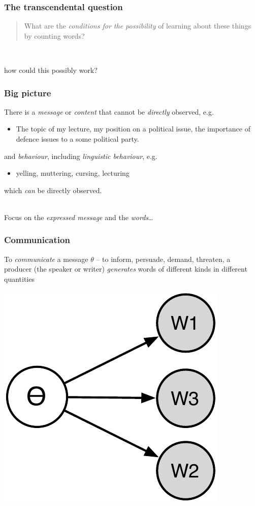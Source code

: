 \documentclass[11pt,compress,professionalfonts]{beamer}
\newcommand{\ita}{\begin{itemize}}
\newcommand{\itm}{\item[]}
\newcommand{\itz}{\end{itemize}}
\begin{document}
\begin{frame}\frametitle{The transcendental question}

\begin{quote}
What are the \textit{conditions for the possibility} of learning about these things by counting words?
\end{quote}

~\\
\centerline{how could this possibly work?}

\end{frame}
\begin{frame}[t]\frametitle{Big picture}

There is a \textsl{message} or \textit{content} that cannot be \textit{directly} observed, e.g.
\ita
\itm The topic of my lecture, my position on a political issue, the importance of defence issues to a some political party.
\itz
and \textit{behaviour}, including \textsl{linguistic behaviour}, e.g.
\ita
\itm yelling, muttering, cursing, lecturing
\itz
which \textit{can} be directly observed.

~\\
Focus on the \textit{expressed message} and the \textit{words}\ldots

\end{frame}
\begin{frame}[t]\frametitle{Communication}

To \textsl{communicate} a message $\theta$ -- to inform, persuade, demand, threaten, a producer (the speaker or writer) \textsl{generates} words of different kinds in different quantities


\begin{center}
\includegraphics[scale=.9]{pictures/gen}
\end{center}

\end{frame}
\end{document}

